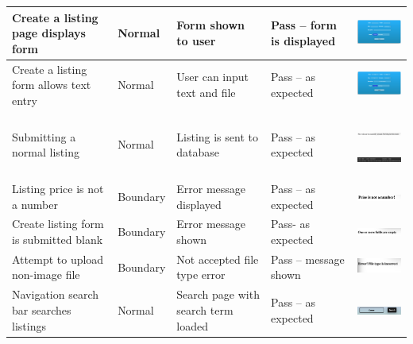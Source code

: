 \begin{center}
\begin{longtable}{|P{23mm}|P{20mm}|P{19mm}|P{20mm}|P{54mm}|}
Create a listing page displays form & Normal & Form shown to user & Pass
-- form is displayed &
\includegraphics[width=51mm]{ch4_testing_for_eval/media/image20.png} \\ \hline
Create a listing form allows text entry & Normal & User can input text
and file & Pass -- as expected &
\includegraphics[width=51mm]{ch4_testing_for_eval/media/image21.png} \\ \hline
Submitting a normal listing & Normal & Listing is sent to database &
Pass -- as expected &
\includegraphics[width=51mm]{ch4_testing_for_eval/media/image22.png}

\includegraphics[width=51mm]{ch4_testing_for_eval/media/image23.png} \\ \hline
Listing price is not a number & Boundary & Error message displayed &
Pass -- as expected &
\includegraphics[width=51mm]{ch4_testing_for_eval/media/image24.png} \\ \hline
Create listing form is submitted blank & Boundary & Error message shown
& Pass- as expected &
\includegraphics[width=51mm]{ch4_testing_for_eval/media/image25.png} \\ \hline
Attempt to upload non-image file & Boundary & Not accepted file type
error & Pass -- message shown &
\includegraphics[width=51mm]{ch4_testing_for_eval/media/image26.png} \\ \hline
Navigation search bar searches listings & Normal & Search page with
search term loaded & Pass -- as expected &
\includegraphics[width=51mm]{ch4_testing_for_eval/media/image27.png}


\end{longtable}
\end{center}
